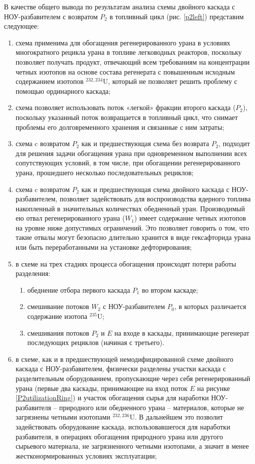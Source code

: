 В качестве общего вывода по результатам анализа схемы двойного каскада с НОУ-разбавителем с возвратом $P_2$ в топливный цикл (рис. \ref{p2left}) представим следующее:
\begin{enumerate}
    \item схема применима для обогащения регенерированного урана в условиях многократного рецикла урана в топливе легководных реакторов, поскольку позволяет получать продукт, отвечающий всем требованиям на концентрации четных изотопов на основе состава регенерата с повышенным исходным содержанием изотопов $^{232,234}$U, который не позволяет решить проблему с помощью ординарного каскада;
    \item схема позволяет использовать поток «легкой» фракции второго каскада ($P_2$), поскольку указанный поток возвращается в топливный цикл, что снимает проблемы его долговременного хранения и связанные с ним затраты;
    \item схема c возвратом $P_2$ как и предшествующая схема без возврата $P_2$, подходит для решения задачи обогащения урана при одновременном выполнении всех сопутствующих условий, в том числе, при обогащении регенерированного урана, прошедшего несколько последовательных рециклов;
    \item схема c возвратом $P_2$ как и предшествующая схема двойного каскада с НОУ-разбавителем, позволяет задействовать для воспроизводства ядерного топлива накопленный в значительных количествах обедненный уран. Производимый ею отвал регенерированного урана ($W_1$) имеет содержание четных изотопов на уровне ниже допустимых ограничений. Это позволяет говорить о том, что такие отвалы могут безопасно длительно хранится в виде гексафторида урана или быть переработанными на установке дефторирования;
    \item в схеме на трех стадиях процесса обогащения происходят потери работы разделения:
    \begin{enumerate}
        \item обеднение отбора первого каскада $P_1$ во втором каскаде;
        \item смешивание потоков $W_2$ с НОУ-разбавителем $P_0$, в которых различается содержание изотопа $^{235}$U;
        \item смешивания потоков $P_2$ и $E$ на входе в каскады, принимающие регенерат последующих рециклов (начиная с третьего).
    \end{enumerate}
    \item в схеме, как и в предшествующей немодифицированной схеме двойного каскада с НОУ-разбавителем, физически разделены участки каскада с разделительным оборудованием, пропускающие через себя регенерированный урана (первые два каскады, принимающие на вход поток $E$ на рисунке \ref{P2utilizationRing}) и участок обогащения сырья для наработки НОУ-разбавителя -- природного или обедненного урана -- материалов, которые не загрязнены четными изотопами $^{232,236}$U. В дальнейшем это позволит задействовать оборудование каскада, использовавшегося для наработки разбавителя, в операциях обогащения природного урана или другого сырьевого материала, не загрязненного четными изотопами, а значит в менее жестконормированных условиях эксплуатации;

\end{enumerate}
